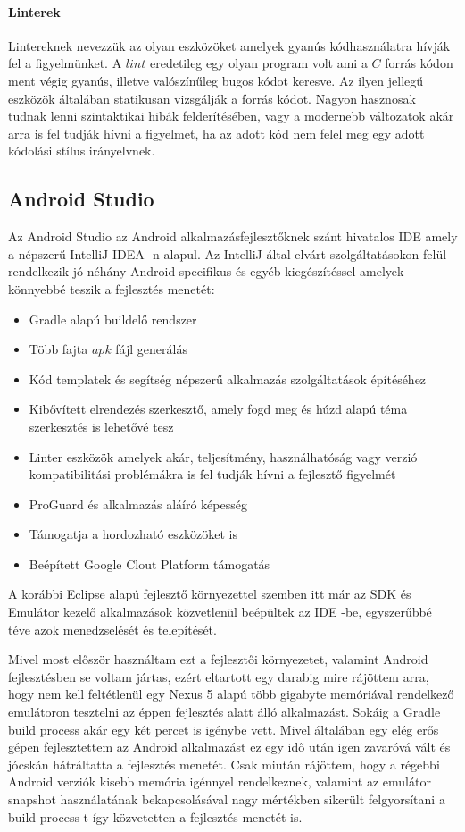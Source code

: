 \documentclass[12pt]{report}
\theoremstyle{definition}
\begin{document}
	\paragraph{Linterek} Lintereknek nevezzük az olyan eszközöket amelyek gyanús kódhasználatra hívják fel a figyelmünket. A $lint$ eredetileg egy olyan program volt ami a $C$ forrás kódon ment végig gyanús, illetve valószínűleg bugos kódot keresve. Az ilyen jellegű eszközök általában statikusan vizsgálják a forrás kódot. Nagyon hasznosak tudnak lenni szintaktikai hibák felderítésében, vagy a modernebb változatok akár arra is fel tudják hívni a figyelmet, ha az adott kód nem felel meg egy adott kódolási stílus irányelvnek.
	
	\subsection{Android Studio}
	Az Android Studio \cite{Android Studio} az Android alkalmazásfejlesztőknek szánt hivatalos IDE amely a népszerű IntelliJ IDEA -n alapul. Az IntelliJ által elvárt szolgáltatásokon felül rendelkezik jó néhány Android specifikus és egyéb kiegészítéssel amelyek könnyebbé teszik a fejlesztés menetét:
	
	\begin{itemize}
		\item Gradle alapú buildelő rendszer
		\item Több fajta $apk$ fájl generálás
		\item Kód templatek és segítség népszerű alkalmazás szolgáltatások építéséhez
		\item Kibővített elrendezés szerkesztő, amely fogd meg és húzd alapú téma szerkesztés is lehetővé tesz
		\item Linter eszközök amelyek akár, teljesítmény, használhatóság vagy verzió kompatibilitási problémákra is fel tudják hívni a fejlesztő figyelmét
		\item ProGuard és alkalmazás aláíró képesség
		\item Támogatja a hordozható eszközöket is
		\item Beépített Google Clout Platform támogatás
	\end{itemize}
	
	A korábbi Eclipse alapú fejlesztő környezettel szemben itt már az SDK és Emulátor kezelő alkalmazások közvetlenül beépültek az IDE -be, egyszerűbbé téve azok menedzselését és telepítését.
	
	Mivel most először használtam ezt a fejlesztői környezetet, valamint Android fejlesztésben se voltam jártas, ezért eltartott egy darabig mire rájöttem arra, hogy nem kell feltétlenül egy Nexus 5 alapú több gigabyte memóriával rendelkező emulátoron tesztelni az éppen fejlesztés alatt álló alkalmazást. Sokáig a Gradle build process akár egy két percet is igénybe vett. Mivel általában egy elég erős gépen fejlesztettem az Android alkalmazást ez egy idő után igen zavaróvá vált és jócskán hátráltatta a fejlesztés menetét. Csak miután rájöttem, hogy a régebbi Android verziók kisebb memória igénnyel rendelkeznek, valamint az emulátor snapshot használatának bekapcsolásával nagy mértékben sikerült felgyorsítani a build process-t így közvetetten a fejlesztés menetét is.
	
\end{document}
